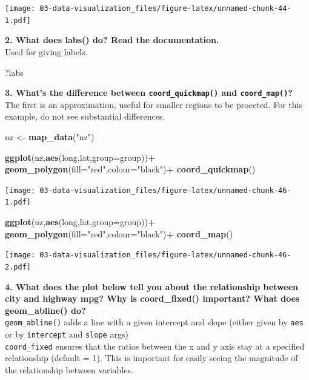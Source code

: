 \documentclass[]{book}
\newenvironment{Shaded}{\begin{snugshade}}{\end{snugshade}}
\newcommand{\DataTypeTok}[1]{\textcolor[rgb]{0.13,0.29,0.53}{#1}}
\newcommand{\KeywordTok}[1]{\textcolor[rgb]{0.13,0.29,0.53}{\textbf{#1}}}
\newcommand{\NormalTok}[1]{#1}
\newcommand{\OperatorTok}[1]{\textcolor[rgb]{0.81,0.36,0.00}{\textbf{#1}}}
\newcommand{\StringTok}[1]{\textcolor[rgb]{0.31,0.60,0.02}{#1}}
\theoremstyle{definition}
\theoremstyle{definition}
\theoremstyle{definition}
\theoremstyle{remark}
\begin{document}
\texttt{[image: 03-data-visualization\_files/figure-latex/unnamed-chunk-44-1.pdf]}

\textbf{2. What does labs() do? Read the documentation.}\\
Used for giving labels.

\begin{Shaded}
\begin{Highlighting}[]
\NormalTok{?labs}
\end{Highlighting}
\end{Shaded}

\textbf{3. What's the difference between \texttt{coord\_quickmap()} and
\texttt{coord\_map()}?}\\
The first is an approximation, useful for smaller regions to be
proected. For this example, do not see substantial differences.

\begin{Shaded}
\begin{Highlighting}[]
\NormalTok{nz <-}\StringTok{ }\KeywordTok{map_data}\NormalTok{(}\StringTok{"nz"}\NormalTok{)}

\KeywordTok{ggplot}\NormalTok{(nz,}\KeywordTok{aes}\NormalTok{(long,lat,}\DataTypeTok{group=}\NormalTok{group))}\OperatorTok{+}
\StringTok{  }\KeywordTok{geom_polygon}\NormalTok{(}\DataTypeTok{fill=}\StringTok{"red"}\NormalTok{,}\DataTypeTok{colour=}\StringTok{"black"}\NormalTok{)}\OperatorTok{+}
\StringTok{  }\KeywordTok{coord_quickmap}\NormalTok{()}
\end{Highlighting}
\end{Shaded}

\texttt{[image: 03-data-visualization\_files/figure-latex/unnamed-chunk-46-1.pdf]}

\begin{Shaded}
\begin{Highlighting}[]
\KeywordTok{ggplot}\NormalTok{(nz,}\KeywordTok{aes}\NormalTok{(long,lat,}\DataTypeTok{group=}\NormalTok{group))}\OperatorTok{+}
\StringTok{  }\KeywordTok{geom_polygon}\NormalTok{(}\DataTypeTok{fill=}\StringTok{"red"}\NormalTok{,}\DataTypeTok{colour=}\StringTok{"black"}\NormalTok{)}\OperatorTok{+}
\StringTok{  }\KeywordTok{coord_map}\NormalTok{()}
\end{Highlighting}
\end{Shaded}

\texttt{[image: 03-data-visualization\_files/figure-latex/unnamed-chunk-46-2.pdf]}

\textbf{4. What does the plot below tell you about the relationship
between city and highway mpg? Why is coord\_fixed() important? What does
geom\_abline() do?}\\
\texttt{geom\_abline()} adds a line with a given intercept and slope
(either given by \texttt{aes} or by \texttt{intercept} and
\texttt{slope} args)\\
\texttt{coord\_fixed} ensures that the ratios between the x and y axis
stay at a specified relationship (default = 1). This is important for
easily seeing the magnitude of the relationship between variables.
\end{document}
